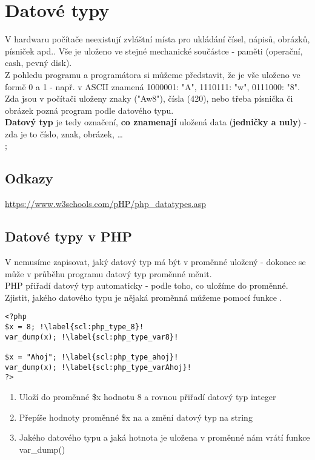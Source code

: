 \section{Datové typy}
V hardwaru počítače neexistují zvláštní místa pro ukládání čísel, nápisů, obrázků, písniček apd.. Vše je uloženo ve stejné mechanické součástce - paměti (operační, cash, pevný disk).\\
Z pohledu programu a programátora si můžeme představit, že je vše uloženo ve formě 0 a 1 - např. v ASCII znamená 1000001: "A", 1110111: "w", 0111000: "8".\\
Zda jsou v počítači uloženy znaky ("Aw8"), čísla (420), nebo třeba písnička či obrázek pozná program podle datového typu.\\
\textbf{Datový typ} je tedy označení, \textbf{co znamenají} uložená data (\textbf{jedničky a nuly}) - zda je to číslo, znak, obrázek, \dots \\;

\subsection{Odkazy}
\url{https://www.w3schools.com/pHP/php_datatypes.asp}

\subsection{Datové typy v PHP}
V nemusíme zapisovat, jaký datový typ má být v proměnné uložený - dokonce se může v průběhu programu datový typ proměnné měnit.\\
PHP přiřadí datový typ automaticky - podle toho, co uložíme do proměnné.\\
Zjistit, jakého datového typu je nějaká proměnná můžeme pomocí funkce .\\
\begin{minipage}[t]{.45\textwidth}
\begin{code}
\begin{verbatim}
<?php
$x = 8; !\label{scl:php_type_8}!
var_dump(x); !\label{scl:php_type_var8}!

$x = "Ahoj"; !\label{scl:php_type_ahoj}!
var_dump(x); !\label{scl:php_type_varAhoj}!
?>
\end{verbatim}

\label{code:typy_type}
\end{code}
\end{minipage}
\begin{minipage}[t]{.45\textwidth}
\begin{enumerate}
\item[ř. \ref{scl:php_type_8}:] Uloží do proměnné \$x hodnotu 8 a rovnou přiřadí datový typ integer
\item[ř. \ref{scl:php_type_ahoj}:] Přepíše hodnoty proměnné \$x na  a změní datový typ na string
\item[ř. \ref{scl:php_type_var8}, \ref{scl:php_type_varAhoj}:] Jakého datového typu a jaká hotnota je uložena v proměnné nám vrátí funkce var\_dump()
\end{enumerate}
\end{minipage}\\ 

